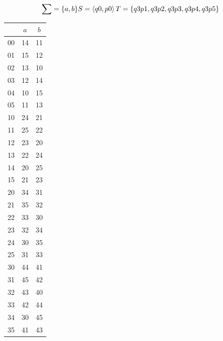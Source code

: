 \documentclass{article}
\begin{document}
\begin{enumerate}
\begin{center}
\[
    \sum = \{a, b\} \\
    S = \left\langle q0,p0 \right\rangle \\
    T = \{q3p1, q3p2, q3p3, q3p4, q3p5\}
\]
\end{center}
        \begin{center}
            \begin{tabular}{ |c|c|c| } 
            \hline
            & $a$ & $b$ \\
            \hline
            00 & 14 & 11\\
            \hline
            01 & 15 & 12\\
            \hline
            02 & 13 & 10\\
            \hline
            03 & 12 & 14\\
            \hline
            04 & 10 & 15\\
            \hline
            05 & 11 & 13\\
            \hline
            10 & 24 & 21\\
            \hline
            11 & 25 & 22\\
            \hline
            12 & 23 & 20\\
            \hline
            13 & 22 & 24\\
            \hline
            14 & 20 & 25\\
            \hline
            15 & 21 & 23\\
            \hline
            20 & 34 & 31\\
            \hline
            21 & 35 & 32\\
            \hline
            22 & 33 & 30\\
            \hline
            23 & 32 & 34\\
            \hline
            24 & 30 & 35\\
            \hline
            25 & 31 & 33\\
            \hline
            30 & 44 & 41\\
            \hline
            31 & 45 & 42\\
            \hline
            32 & 43 & 40\\
            \hline
            33 & 42 & 44\\
            \hline
            34 & 30 & 45\\
            \hline
            35 & 41 & 43\\
            \hline

\end{tabular}
\end{center}
\end{enumerate}
\end{document}
